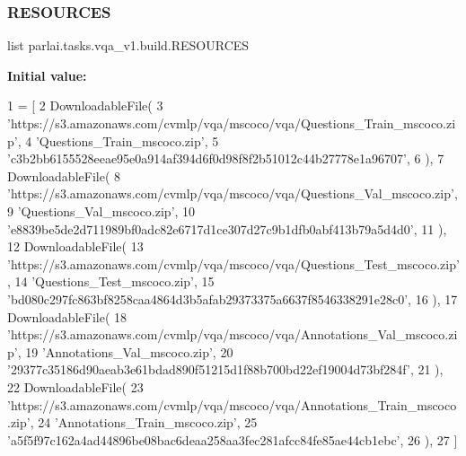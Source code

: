 \subsubsection{\texorpdfstring{R\+E\+S\+O\+U\+R\+C\+ES}{RESOURCES}}
{\footnotesize\ttfamily list parlai.\+tasks.\+vqa\+\_\+v1.\+build.\+R\+E\+S\+O\+U\+R\+C\+ES}

{\bfseries Initial value\+:}
\begin{DoxyCode}
1 =  [
2     DownloadableFile(
3         \textcolor{stringliteral}{'https://s3.amazonaws.com/cvmlp/vqa/mscoco/vqa/Questions\_Train\_mscoco.zip'},
4         \textcolor{stringliteral}{'Questions\_Train\_mscoco.zip'},
5         \textcolor{stringliteral}{'c3b2bb6155528eeae95e0a914af394d6f0d98f8f2b51012c44b27778e1a96707'},
6     ),
7     DownloadableFile(
8         \textcolor{stringliteral}{'https://s3.amazonaws.com/cvmlp/vqa/mscoco/vqa/Questions\_Val\_mscoco.zip'},
9         \textcolor{stringliteral}{'Questions\_Val\_mscoco.zip'},
10         \textcolor{stringliteral}{'e8839be5de2d711989bf0adc82e6717d1ce307d27c9b1dfb0abf413b79a5d4d0'},
11     ),
12     DownloadableFile(
13         \textcolor{stringliteral}{'https://s3.amazonaws.com/cvmlp/vqa/mscoco/vqa/Questions\_Test\_mscoco.zip'},
14         \textcolor{stringliteral}{'Questions\_Test\_mscoco.zip'},
15         \textcolor{stringliteral}{'bd080c297fc863bf8258caa4864d3b5afab29373375a6637f8546338291e28c0'},
16     ),
17     DownloadableFile(
18         \textcolor{stringliteral}{'https://s3.amazonaws.com/cvmlp/vqa/mscoco/vqa/Annotations\_Val\_mscoco.zip'},
19         \textcolor{stringliteral}{'Annotations\_Val\_mscoco.zip'},
20         \textcolor{stringliteral}{'29377c35186d90aeab3e61bdad890f51215d1f88b700bd22ef19004d73bf284f'},
21     ),
22     DownloadableFile(
23         \textcolor{stringliteral}{'https://s3.amazonaws.com/cvmlp/vqa/mscoco/vqa/Annotations\_Train\_mscoco.zip'},
24         \textcolor{stringliteral}{'Annotations\_Train\_mscoco.zip'},
25         \textcolor{stringliteral}{'a5f5f97c162a4ad44896be08bac6deaa258aa3fec281afcc84fe85ae44cb1ebc'},
26     ),
27 ]
\end{DoxyCode}
